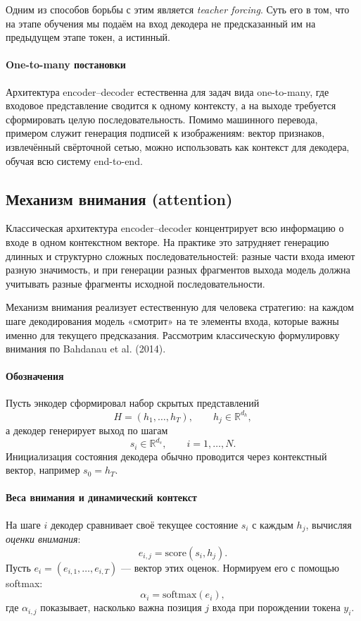 \documentclass[12pt,a4paper]{article}
\begin{document}
Одним из способов борьбы с этим является \textit{teacher forcing}. Суть его в том, что на этапе обучения мы подаём на вход декодера не предсказанный им на предыдущем этапе токен, а истинный.


\paragraph{One-to-many постановки}
Архитектура encoder--decoder естественна для задач вида one-to-many, где входовое представление сводится к одному контексту, а на выходе требуется сформировать целую последовательность. Помимо машинного перевода, примером служит генерация подписей к изображениям: вектор признаков, извлечённый свёрточной сетью, можно использовать как контекст для декодера, обучая всю систему end-to-end.


\subsection{Механизм внимания (attention)}

Классическая архитектура encoder--decoder концентрирует всю информацию о входе в одном контекстном векторе. На практике это затрудняет генерацию длинных и структурно сложных последовательностей: разные части входа имеют разную значимость, и при генерации разных фрагментов выхода модель должна учитывать разные фрагменты исходной последовательности.

Механизм внимания реализует естественную для человека стратегию: на каждом шаге декодирования модель «смотрит» на те элементы входа, которые важны именно для текущего предсказания. Рассмотрим классическую формулировку внимания по Bahdanau et al. (2014).

\paragraph{Обозначения}
Пусть энкодер сформировал набор скрытых представлений
\[
H = (h_1,\dots,h_T), \qquad h_j \in \mathbb{R}^{d_h},
\]
а декодер генерирует выход по шагам
\[
s_i \in \mathbb{R}^{d_s}, \qquad i = 1,\dots,N.
\]
Инициализация состояния декодера обычно проводится через контекстный вектор, например $s_0 = h_T$.

\paragraph{Веса внимания и динамический контекст}
На шаге $i$ декодер сравнивает своё текущее состояние $s_i$ с каждым $h_j$, вычисляя \emph{оценки внимания}:
\[
e_{i,j} = \mathrm{score}(s_i, h_j).
\]
Пусть $e_i = (e_{i,1},\dots,e_{i,T})$ — вектор этих оценок. Нормируем его с помощью softmax:
\[
\alpha_i = \mathrm{softmax}(e_i),
\]
где $\alpha_{i,j}$ показывает, насколько важна позиция $j$ входа при порождении токена $y_i$.
\end{document}
